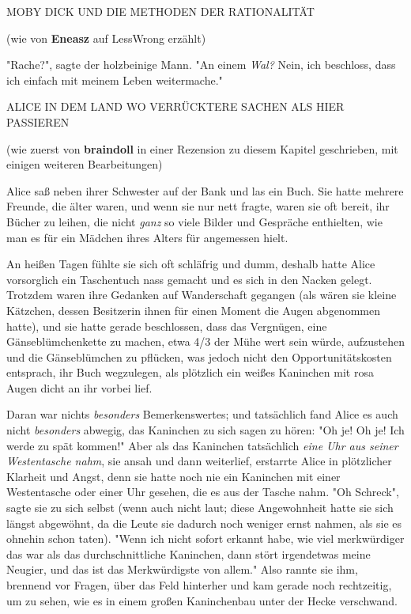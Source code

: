 {MOBY DICK UND DIE METHODEN DER RATIONALITÄT

(wie von \textbf{Eneasz} auf LessWrong erzählt)

"Rache?", sagte der holzbeinige Mann. "An einem \emph{Wal?} Nein, ich beschloss, dass ich einfach mit meinem Leben weitermache."

ALICE IN DEM LAND WO VERRÜCKTERE SACHEN ALS HIER PASSIEREN

(wie zuerst von \textbf{braindoll} in einer Rezension zu diesem Kapitel geschrieben, mit einigen weiteren Bearbeitungen)

Alice saß neben ihrer Schwester auf der Bank und las ein Buch. Sie hatte mehrere Freunde, die älter waren, und wenn sie nur nett fragte, waren sie oft bereit, ihr Bücher zu leihen, die nicht \emph{ganz} so viele Bilder und Gespräche enthielten, wie man es für ein Mädchen ihres Alters für angemessen hielt.

An heißen Tagen fühlte sie sich oft schläfrig und dumm, deshalb hatte Alice vorsorglich ein Taschentuch nass gemacht und es sich in den Nacken gelegt. Trotzdem waren ihre Gedanken auf Wanderschaft gegangen (als wären sie kleine Kätzchen, dessen Besitzerin ihnen für einen Moment die Augen abgenommen hatte), und sie hatte gerade beschlossen, dass das Vergnügen, eine Gänseblümchenkette zu machen, etwa 4/3 der Mühe wert sein würde, aufzustehen und die Gänseblümchen zu pflücken, was jedoch nicht den Opportunitätskosten entsprach, ihr Buch wegzulegen, als plötzlich ein weißes Kaninchen mit rosa Augen dicht an ihr vorbei lief.

Daran war nichts \emph{besonders} Bemerkenswertes; und tatsächlich fand Alice es auch nicht \emph{besonders} abwegig, das Kaninchen zu sich sagen zu hören: "Oh je! Oh je! Ich werde zu spät kommen!" Aber als das Kaninchen tatsächlich \emph{eine Uhr aus seiner Westentasche nahm}, sie ansah und dann weiterlief, erstarrte Alice in plötzlicher Klarheit und Angst, denn sie hatte noch nie ein Kaninchen mit einer Westentasche oder einer Uhr gesehen, die es aus der Tasche nahm. "Oh Schreck", sagte sie zu sich selbst (wenn auch nicht laut; diese Angewohnheit hatte sie sich längst abgewöhnt, da die Leute sie dadurch noch weniger ernst nahmen, als sie es ohnehin schon taten). "Wenn ich nicht sofort erkannt habe, wie viel merkwürdiger das war als das durchschnittliche Kaninchen, dann stört irgendetwas meine Neugier, und das ist das Merkwürdigste von allem." Also rannte sie ihm, brennend vor Fragen, über das Feld hinterher und kam gerade noch rechtzeitig, um zu sehen, wie es in einem großen Kaninchenbau unter der Hecke verschwand.

}

